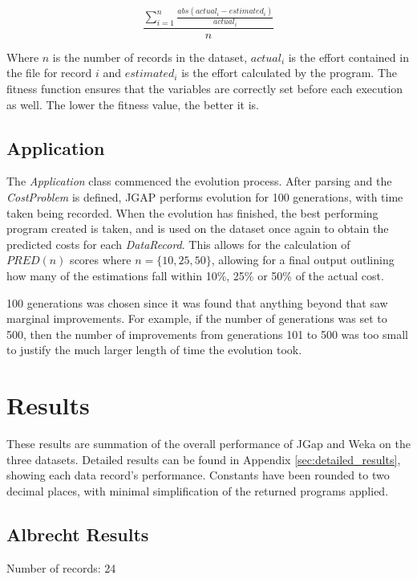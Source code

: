 \documentclass[11pt, a4paper]{article}
\begin{document}
\[\frac{\sum_{i = 1}^{n} \frac{abs(actual_i - estimated_i)}{actual_i}}{n}\]

Where \(n\) is the number of records in the dataset, \(actual_i\) is the effort
contained in the file for record \(i\) and \(estimated_i\) is the effort
calculated by the program. The fitness function ensures that the variables
are correctly set before each execution as well. The lower the fitness value,
the better it is.

\subsection{Application} %
\label{sub:application}
The \emph{Application} class commenced the evolution process. After parsing and
the \emph{CostProblem} is defined, JGAP performs evolution for 100 generations,
with time taken being recorded. When the evolution has finished, the best
performing program created is taken, and is used on the dataset once again to
obtain the predicted costs for each \emph{DataRecord}. This allows for the
calculation of \(PRED(n)\) scores where \(n = \{10, 25, 50\}\), allowing for a
final output outlining how many of the estimations fall within 10\%, 25\% or
50\% of the actual cost.

100 generations was chosen since it was found that anything beyond that saw
marginal improvements. For example, if the number of generations was set to 500,
then the number of improvements from generations 101 to 500 was too small to
justify the much larger length of time the evolution took.

\section{Results} %
\label{sec:results}
These results are summation of the overall performance of JGap and Weka on the
three datasets. Detailed results can be found in Appendix
\ref{sec:detailed_results}, showing each data record's performance.
Constants have been rounded to two decimal places, with minimal simplification
of the returned programs applied.

\subsection{Albrecht Results} %
\label{sub:albrecht_results}
Number of records: 24
\end{document}
